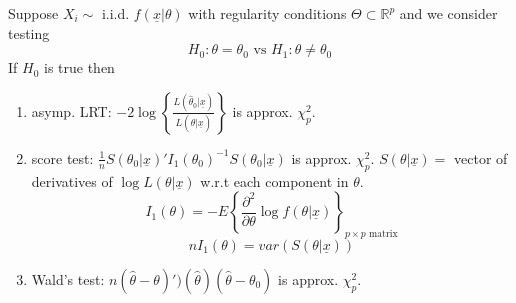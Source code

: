 \documentclass[english, 11pt]{article}
\begin{document}
\begin{thrm}\label{thrm:533}
Suppose $X_i\sim$ i.i.d. $f(\underline{x}|\theta)$ with regularity conditions $\Theta\subset\mathbb{R}^p$ and we consider testing
$$
H_0:\theta=\theta_0\text{  vs  }H_1:\theta\not=\theta_0
$$
If $H_0$ is true then
\begin{enumerate}
\item asymp. LRT: $-2\log\left\{\frac{L(\hat{\theta}_0|\underline{x})}{L(\hat{\theta}|\underline{x})}\right\}$ is approx. $\chi^2_p$.
\item score test: $\frac{1}{n}S(\theta_0|\underline{x})'I_1(\theta_0)^{-1}S(\theta_0|\underline{x})$ is approx. $\chi^2_p$. $S(\theta|\underline{x})=$ vector of derivatives of $\log L(\theta|\underline{x})$ w.r.t each component in $\theta$.
$$
I_1(\theta)=-E\left\{\frac{\partial^2}{\partial\theta}\log f(\theta|\underline{x})\right\}_{p\times p\text{ matrix}}
$$
$$
nI_1(\theta)=var(S(\theta|\underline{x}))
$$
\item Wald's test: $n(\hat{\theta}-\theta)')(\hat{\theta})(\hat{\theta}-\theta_0)$ is approx. $\chi_p^2$.
\end{enumerate}
\end{thrm}
\end{document}
